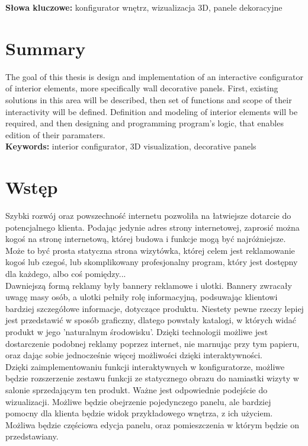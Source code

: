 \documentclass{article} %
\begin{document}
\textbf{Słowa kluczowe:} konfigurator wnętrz, wizualizacja 3D, panele dekoracyjne

\section*{Summary}
The goal of this thesis is design and implementation of an interactive configurator of interior elements, more specifically wall decorative panels. First, existing solutions in this area will be described, then set of functions and scope of their interactivity will be defined. Definition and modeling of interior elements will be required, and then designing and programming program's logic, that enables edition of their paramaters.
\\


\textbf{Keywords:} interior configurator, 3D visualization, decorative panels

\newpage

\tableofcontents

\newpage

\section{Wstęp}


Szybki rozwój oraz powszechność internetu pozwoliła na łatwiejsze dotarcie do potencjalnego klienta. Podając jedynie adres strony internetowej, zaprosić można kogoś na stronę internetową, której budowa i funkcje mogą być najróżniejsze. Może to być prosta statyczna strona wizytówka, której celem jest reklamowanie kogoś lub czegoś, lub skomplikowany profesjonalny program, który jest dostępny dla każdego, albo coś pomiędzy...
\\

Dawniejszą formą reklamy były bannery reklamowe i ulotki. Bannery zwracały uwagę masy osób, a ulotki pełniły rolę informacyjną, podsuwając klientowi bardziej szczegółowe informacje, dotyczące produktu. Niestety pewne rzeczy lepiej jest przedstawić w sposób graficzny, dlatego powstały katalogi, w których widać produkt w jego 'naturalnym środowisku'. Dzięki technologii możliwe jest dostarczenie podobnej reklamy poprzez internet, nie marnując przy tym papieru, oraz dając sobie jednocześnie więcej możliwości dzięki interaktywności.
\\

Dzięki zaimplementowaniu funkcji interaktywnych w konfiguratorze, możliwe będzie rozszerzenie zestawu funkcji ze statycznego obrazu do namiastki wizyty w salonie sprzedającym ten produkt. Ważne jest odpowiednie podejście do wizualizacji. Możliwe będzie obejrzenie pojedynczego panelu, ale bardziej pomocny dla klienta będzie widok przykładowego wnętrza, z ich użyciem. Możliwa będzie częściowa edycja panelu, oraz pomieszczenia w którym będzie on przedstawiany.
\\
\end{document}
